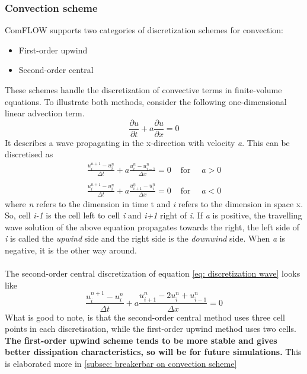 \subsubsection{Convection scheme}
ComFLOW supports two categories of discretization schemes for convection:
\begin{itemize}
    \item First-order upwind
    \item Second-order central
\end{itemize}
These schemes handle the discretization of convective terms in finite-volume equations. To illustrate both methods, consider the following one-dimensional linear advection term.
\begin{equation}
\frac{\partial u}{\partial t}+a \frac{\partial u}{\partial x}=0
\label{eq: discretization wave}
\end{equation}
It describes a wave propagating in the x-direction with velocity \textit{a}. This can be discretised as
\begin{equation}
\begin{array}{ll}
\frac{u_{i}^{n+1}-u_{i}^{n}}{\Delta t}+a \frac{u_{i}^{n}-u_{i-1}^{n}}{\Delta x}=0 & \text { for } \quad a>0 \\
\\
\frac{u_{i}^{n+1}-u_{i}^{n}}{\Delta t}+a \frac{u_{i+1}^{n}-u_{i}^{n}}{\Delta x}=0 & \text { for } \quad a<0
\end{array}
\end{equation}
where \textit{n} refers to the dimension in time t and \textit{i} refers to the dimension in space x. So, cell \textit{i-1} is the cell left to cell \textit{i} and \textit{i+1} right of \textit{i}. If \textit{a} is positive, the travelling wave solution of the above equation propagates towards the right, the left side of \textit{i} is called the \textit{upwind} side and the right side is the \textit{downwind} side. When \textit{a} is negative, it is the other way around.\\
\\
The second-order central discretization of equation \ref{eq: discretization wave} looks like
\begin{equation}
    \frac{ u_{i}^{n+1}-u_{i}^{n}}{\Delta t}+a \frac{u_{i+1}^{n}- 2u_{i}^{n} + u_{i-1}^{n}}{\Delta x}=0 
\end{equation}
What is good to note, is that the second-order central method uses three cell points in each discretisation, while the first-order upwind method uses two cells. \textbf{The first-order upwind scheme tends to be more stable and gives better dissipation characteristics, so will be for future simulations.} This is elaborated more in \ref{subsec: breakerbar on convection scheme} 


